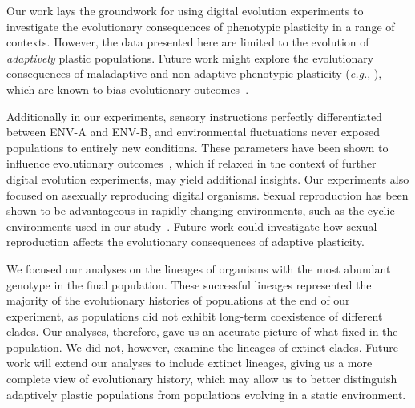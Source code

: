 \documentclass[utf8]{frontiersSCNS} %
\begin{document}
\begin{raggedbottom}

Our work lays the groundwork for using digital evolution experiments to investigate the evolutionary consequences of phenotypic plasticity in a range of contexts.
However, the data presented here are limited to the evolution of \textit{adaptively} plastic populations.
Future work might explore the evolutionary consequences of maladaptive and non-adaptive phenotypic plasticity (\textit{e.g.}, \citealt{leroi_temperature_1994}), which are known to bias evolutionary outcomes~\citep{ghalambor_non-adaptive_2015}.

Additionally in our experiments, sensory instructions perfectly differentiated between ENV-A and ENV-B, and environmental fluctuations never exposed populations to entirely new conditions.
These parameters have been shown to influence evolutionary outcomes~\citep{li_digital_2004,boyer_adaptation_2021}, which if relaxed in the context of further digital evolution experiments, may yield additional insights.
Our experiments also focused on asexually reproducing digital organisms. 
Sexual reproduction has been shown to be advantageous in rapidly changing environments, such as the cyclic environments used in our study~\citep{misevic_experiments_2010}. 
Future work could investigate how sexual reproduction affects the evolutionary consequences of adaptive plasticity. 

We focused our analyses on the lineages of organisms with the most abundant genotype in the final population.
These successful lineages represented the majority of the evolutionary histories of populations at the end of our experiment, as populations did not exhibit long-term coexistence of different clades.
Our analyses, therefore, gave us an accurate picture of what fixed in the population.
We did not, however, examine the lineages of extinct clades.
Future work will extend our analyses to include extinct lineages, giving us a more complete view of evolutionary history, which may allow us to better distinguish adaptively plastic populations from populations evolving in a static environment.


\end{raggedbottom}
\end{document}

